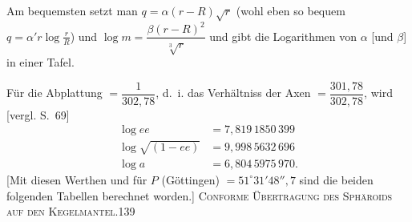 \par\endgroup
Am bequemsten setzt man $q=\alpha(r-R)\sqrt r$ (wohl eben so bequem $q=\alpha'r\log\frac rR$) und $\log m=\dfrac{\beta(r-R)^2}{\sqrt[3]r}$ und gibt die Logarithmen von $\alpha$ [und $\beta$] in einer Tafel.

Für die Abplattung $=\dfrac1{302{,}78}$, d.~i. das Verhältniss der Axen $=\dfrac{301{,}78}{302{,}78}$, wird [vergl. S.~69]
\[
\begin{aligned}
\log ee&=7{,}819\,1850\,399\\
\log\sqrt{(1-ee)}&=9{,}998\,5632\,696\\
\log a&=6{,}804\,5975\,970.
\end{aligned}
\]
[Mit diesen Werthen und für $P$ (Göttingen) $=51^\circ31'48''{,}7$ sind die beiden folgenden Tabellen berechnet worden.]
\clearpage
\noindent\mbox{}\hfill{\small\textsc{Conforme Übertragung des Sphäroids auf den Kegelmantel.}}\hfill139\par\bigskip
